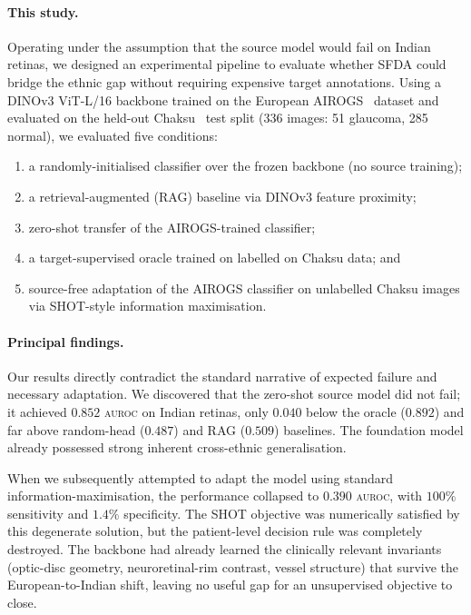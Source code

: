 \documentclass[11pt]{article}
\newcommand{\src}{AIROGS}
\newcommand{\auroc}{\textsc{auroc}}
\begin{document}
\paragraph{This study.}
Operating under the assumption that the source model would fail on Indian retinas, we designed an experimental pipeline to evaluate whether SFDA could bridge the ethnic gap without requiring expensive target annotations.
Using a DINOv3 ViT-L/16 backbone trained on the European
\src{}~\cite{devente2024} dataset and evaluated on the held-out
Chaksu~\cite{kumar2023} test split (336 images: 51 glaucoma, 285 normal),
we evaluated five conditions:
\begin{enumerate}[leftmargin=1.2em,topsep=2pt,itemsep=1pt]
  \item a randomly-initialised classifier over the frozen backbone
    (no source training);
  \item a retrieval-augmented (RAG) baseline via DINOv3 feature proximity;
  \item zero-shot transfer of the AIROGS-trained classifier;
  \item a target-supervised oracle trained on labelled on Chaksu data; and
  \item source-free adaptation of the AIROGS classifier on unlabelled Chaksu images via SHOT-style information maximisation.
\end{enumerate}

\paragraph{Principal findings.}
Our results directly contradict the standard narrative of expected failure and necessary adaptation. We discovered that the zero-shot source model
did not fail; it achieved $0.852$ \auroc{} on Indian retinas, only $0.040$ below the
oracle ($0.892$) and far above random-head ($0.487$) and RAG ($0.509$)
baselines. The foundation model already possessed strong inherent cross-ethnic generalisation.

When we subsequently attempted to adapt the model using standard information-maximisation, the performance collapsed to $0.390$ \auroc{}, with $100\%$ sensitivity and $1.4\%$
specificity. The SHOT objective was numerically satisfied by this degenerate
solution, but the patient-level decision rule was completely destroyed. The backbone had
already learned the clinically relevant invariants (optic-disc geometry,
neuroretinal-rim contrast, vessel structure) that survive the
European-to-Indian shift, leaving no useful gap for an unsupervised
objective to close.
\end{document}
